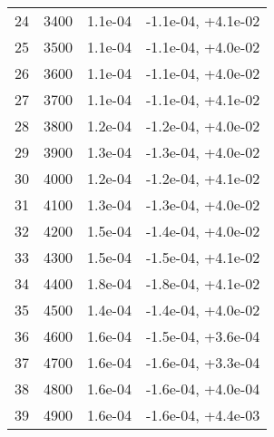 \begin{table}
\begin{adjustbox}{width=1\textwidth/2}
\begin{tabular}{|c|c|c|c|}
\cline{1-4}
24 & 3400 & 1.1e-04 & -1.1e-04, +4.1e-02 \\
\cline{1-4}
25 & 3500 & 1.1e-04 & -1.1e-04, +4.0e-02 \\
\cline{1-4}
26 & 3600 & 1.1e-04 & -1.1e-04, +4.0e-02 \\
\cline{1-4}
27 & 3700 & 1.1e-04 & -1.1e-04, +4.1e-02 \\
\cline{1-4}
28 & 3800 & 1.2e-04 & -1.2e-04, +4.0e-02 \\
\cline{1-4}
29 & 3900 & 1.3e-04 & -1.3e-04, +4.0e-02 \\
\cline{1-4}
30 & 4000 & 1.2e-04 & -1.2e-04, +4.1e-02 \\
\cline{1-4}
31 & 4100 & 1.3e-04 & -1.3e-04, +4.0e-02 \\
\cline{1-4}
32 & 4200 & 1.5e-04 & -1.4e-04, +4.0e-02 \\
\cline{1-4}
33 & 4300 & 1.5e-04 & -1.5e-04, +4.1e-02 \\
\cline{1-4}
34 & 4400 & 1.8e-04 & -1.8e-04, +4.1e-02 \\
\cline{1-4}
35 & 4500 & 1.4e-04 & -1.4e-04, +4.0e-02 \\
\cline{1-4}
36 & 4600 & 1.6e-04 & -1.5e-04, +3.6e-04 \\
\cline{1-4}
37 & 4700 & 1.6e-04 & -1.6e-04, +3.3e-04 \\
\cline{1-4}
38 & 4800 & 1.6e-04 & -1.6e-04, +4.0e-04 \\
\cline{1-4}
39 & 4900 & 1.6e-04 & -1.6e-04, +4.4e-03 \\
\cline{1-4}
\end{tabular}
\end{adjustbox}
\end{table}

